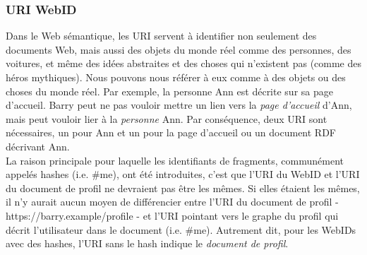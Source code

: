\documentclass[a4paper]{article}
\begin{document}
\subsubsection{URI WebID}
\label{subsec:webid_uri}

Dans le Web sémantique, les URI servent à identifier non seulement des documents Web, mais aussi des objets du monde réel comme des personnes, des voitures, et même des idées abstraites et des choses qui n'existent pas (comme des héros mythiques). Nous pouvons nous référer à eux comme à des objets ou des choses du monde réel. Par exemple, la personne Ann est décrite sur sa page d'accueil. Barry peut ne pas vouloir mettre un lien vers la \textit{page d'accueil} d'Ann, mais peut vouloir lier à la \textit{personne} Ann. Par conséquence, deux URI sont nécessaires, un pour Ann et un pour la page d'accueil ou un document RDF décrivant Ann.\\


La raison principale pour laquelle les identifiants de fragments, communément appelés hashes (i.e. \#me), ont été introduites, c'est que l'URI du WebID et l'URI du document de profil ne devraient pas être les mêmes. Si elles étaient les mêmes, il n'y aurait aucun moyen de différencier entre l'URI du document de profil - https://barry.example/profile - et l'URI pointant vers le graphe du profil qui décrit l'utilisateur dans le document (i.e. \#me). Autrement dit, pour les WebIDs avec des hashes, l'URI sans le hash indique le \textit{document de profil}.\\
\end{document}
